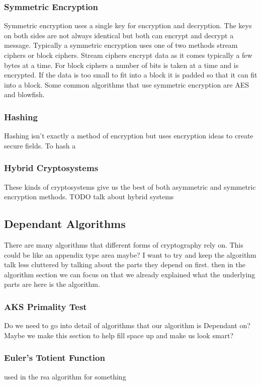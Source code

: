 \documentclass[conference]{IEEEtran}
\begin{document}
\subsubsection{Symmetric Encryption}
Symmetric encryption uses a single key for encryption and decryption. The keys on both sides are not always identical but both can encrypt and decrypt a message. Typically a symmetric encryption uses one of two methods stream ciphers or block ciphers. Stream ciphers encrypt data as it comes typically a few bytes at a time. For block ciphers a number of bits is taken at a time and is encrypted. If the data is too small to fit into a block it is padded so that it can fit into a block. Some common algorithms that use symmetric encryption are AES and blowfish.

\subsubsection{Hashing}
Hashing isn't exactly a method of encryption but uses encryption ideas to create secure fields. To hash a 

\subsubsection{Hybrid Cryptosystems}
These kinds of cryptosystems give us the best of both asymmetric and symmetric encryption methods. TODO talk about hybrid systems

\subsection{Dependant Algorithms}
There are many algorithms that different forms of cryptography rely on.
This could be like an appendix type area maybe?
I want to try and keep the algorithm talk less cluttered by talking about the parts they depend on first.
then in the algorithm section we can focus on that we already explained what the underlying parts are here is the algorithm.

\subsubsection{AKS Primality Test}
Do we need to go into detail of algorithms that our algorithm is Dependant on?
Maybe we make this section to help fill space up and make us look smart?

\subsubsection{Euler's Totient Function}
used in the rsa algorithm for something
\end{document}
